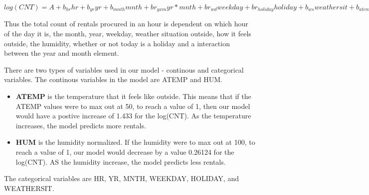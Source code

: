 \documentclass[]{article}
\begin{document}
\(log(CNT) = A + b_{hr} hr + b_{yr} yr + b_{mnth} mnth + br_{yxm} yr*mnth + br_{wd} weekday + br_{holiday} holiday + b_{ws} weathersit + b_{atemp} atemp + br_{hum} hum\)

Thus the total count of rentals procured in an hour is dependent on
which hour of the day it is, the month, year, weekday, weather situation
outside, how it feels outside, the humidity, whether or not today is a
holiday and a interaction between the year and month element.

There are two types of variables used in our model - continous and
categorical variables. The continous variables in the model are ATEMP
and HUM.

\begin{itemize}
\item
  \textbf{ATEMP} is the temperature that it feels like outside. This
  means that if the ATEMP values were to max out at 50, to reach a value
  of 1, then our model would have a postive increase of 1.433 for the
  log(CNT). As the temperature increases, the model predicts more
  rentals.
\item
  \textbf{HUM} is the humidity normalized. If the humidity were to max
  out at 100, to reach a value of 1, our model would decrease by a value
  0.26124 for the log(CNT). AS the humidity increase, the model predicts
  less rentals.
\end{itemize}

The categorical variables are HR, YR, MNTH, WEEKDAY, HOLIDAY, and
WEATHERSIT.
\end{document}
